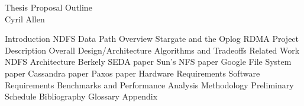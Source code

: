 \documentclass{article}
\begin{document}
\begin{center}
Thesis Proposal Outline \\
Cyril Allen
\end{center}

\begin{outline}[enumerate]
  \1 Introduction
    \2 NDFS
      \3 Data Path Overview
      \3 Stargate and the Oplog
    \2 RDMA
  \1 Project Description
  \1 Overall Design/Architecture
  \1 Algorithms and Tradeoffs
  \1 Related Work
    \2 NDFS Architecture
      \3 Berkely SEDA paper
      \3 Sun's NFS paper
      \3 Google File System paper
      \3 Cassandra paper
      \3 Paxos paper
  \1 Hardware Requirements
  \1 Software Requirements
  \1 Benchmarks and Performance Analysis Methodology
  \1 Preliminary Schedule
  \1 Bibliography
  \1 Glossary
  \1 Appendix
\end{outline}
\end{document}
